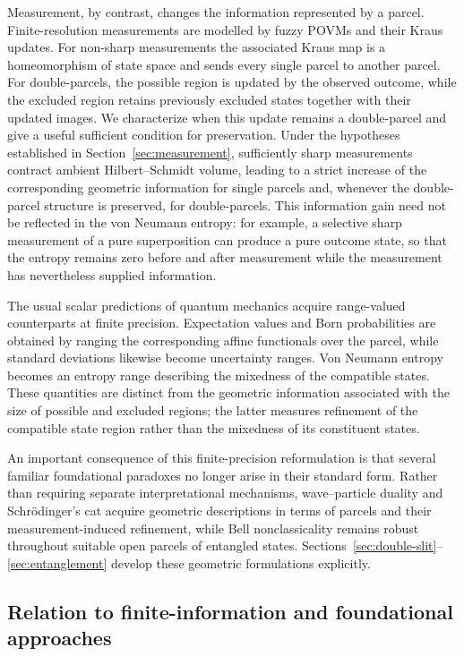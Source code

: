 \documentclass[11pt, onecolumn]{article}
\begin{document}
Measurement, by contrast, changes the information represented by a parcel.
Finite-resolution measurements are modelled by fuzzy POVMs and their Kraus
updates. For non-sharp measurements the associated Kraus map is a
homeomorphism of state space and sends every single parcel to another parcel.
For double-parcels, the possible region is updated by the observed outcome,
while the excluded region retains previously excluded states together with
their updated images. We characterize when this update remains a
double-parcel and give a useful sufficient condition for preservation.
Under the hypotheses established in Section~\ref{sec:measurement},
sufficiently sharp measurements contract ambient Hilbert--Schmidt volume,
leading to a strict increase of the corresponding geometric information for
single parcels and, whenever the double-parcel structure is preserved, for
double-parcels. This information gain need not be reflected in the von
Neumann entropy: for example, a selective sharp measurement of a pure
superposition can produce a pure outcome state, so that the entropy remains
zero before and after measurement while the measurement has nevertheless
supplied information.

The usual scalar predictions of quantum mechanics acquire range-valued
counterparts at finite precision. Expectation values and Born probabilities
are obtained by ranging the corresponding affine functionals over the
parcel, while standard deviations likewise become uncertainty ranges. Von
Neumann entropy becomes an entropy range describing the mixedness of the
compatible states. These quantities are distinct from the geometric
information associated with the size of possible and excluded regions; the
latter measures refinement of the compatible state region rather than the
mixedness of its constituent states.

An important consequence of this finite-precision reformulation is that
several familiar foundational paradoxes no longer arise in their standard
form. Rather than requiring separate interpretational mechanisms,
wave--particle duality and Schr\"odinger's cat acquire geometric
descriptions in terms of parcels and their measurement-induced refinement,
while Bell nonclassicality remains robust throughout suitable open parcels
of entangled states. Sections~\ref{sec:double-slit}--\ref{sec:entanglement}
develop these geometric formulations explicitly.
\subsection{Relation to finite-information and foundational approaches}
\end{document}

